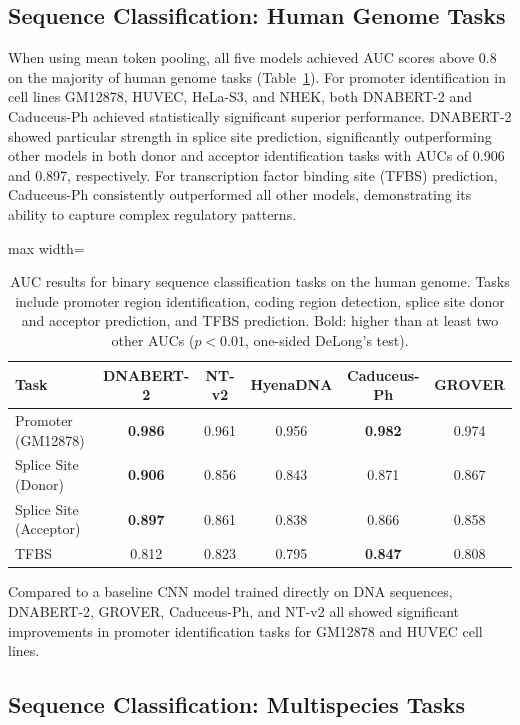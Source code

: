 \documentclass{article}
\begin{document}
\subsection{Sequence Classification: Human Genome Tasks}

When using mean token pooling, all five models achieved AUC scores above 0.8 on the majority of human genome tasks (Table~\ref{tab:human_classification}). For promoter identification in cell lines GM12878, HUVEC, HeLa-S3, and NHEK, both DNABERT-2 and Caduceus-Ph achieved statistically significant superior performance. DNABERT-2 showed particular strength in splice site prediction, significantly outperforming other models in both donor and acceptor identification tasks with AUCs of 0.906 and 0.897, respectively. For transcription factor binding site (TFBS) prediction, Caduceus-Ph consistently outperformed all other models, demonstrating its ability to capture complex regulatory patterns.

\begin{table}[htbp]
\centering
\caption{AUC results for binary sequence classification tasks on the human genome. Tasks include promoter region identification, coding region detection, splice site donor and acceptor prediction, and TFBS prediction. Bold: higher than at least two other AUCs ($p<0.01$, one-sided DeLong's test).}
\label{tab:human_classification}
\begin{adjustbox}{max width=\textwidth}
\begin{tabular}{lccccc}
\toprule
Task & DNABERT-2 & NT-v2 & HyenaDNA & Caduceus-Ph & GROVER \\
\midrule
Promoter (GM12878) & \textbf{0.986} & 0.961 & 0.956 & \textbf{0.982} & 0.974 \\
Splice Site (Donor) & \textbf{0.906} & 0.856 & 0.843 & 0.871 & 0.867 \\
Splice Site (Acceptor) & \textbf{0.897} & 0.861 & 0.838 & 0.866 & 0.858 \\
TFBS & 0.812 & 0.823 & 0.795 & \textbf{0.847} & 0.808 \\
\bottomrule
\end{tabular}
\end{adjustbox}
\end{table}

Compared to a baseline CNN model trained directly on DNA sequences, DNABERT-2, GROVER, Caduceus-Ph, and NT-v2 all showed significant improvements in promoter identification tasks for GM12878 and HUVEC cell lines.

\subsection{Sequence Classification: Multispecies Tasks}
\end{document}
